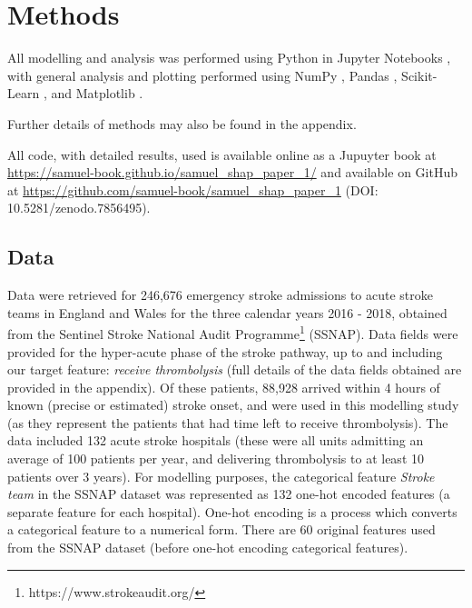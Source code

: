 \renewcommand{\thefootnote}{\alph{footnote}} %

\section{Methods}

All modelling and analysis was performed using Python in Jupyter Notebooks \cite{kluyver_jupyter_2016}, with general analysis and plotting performed using NumPy \cite{harris_array_2020}, Pandas \cite{mckinney-proc-scipy-2010}, Scikit-Learn  \cite{pedregosa_scikit-learn_2011}, and Matplotlib \cite{hunter_matplotlib_2007}. 

Further details of methods may also be found in the appendix. 

All code, with detailed results, used is available online as a Jupuyter book at \url{https://samuel-book.github.io/samuel_shap_paper_1/} and available on GitHub at \url{https://github.com/samuel-book/samuel_shap_paper_1} (DOI: 10.5281/zenodo.7856495). 


\subsection{Data}

Data were retrieved for 246,676 emergency stroke admissions to acute stroke teams in England and Wales for the three calendar years 2016 - 2018, obtained from the Sentinel Stroke National Audit Programme\footnote{https://www.strokeaudit.org/} (SSNAP). Data fields were provided for the hyper-acute phase of the stroke pathway, up to and including our target feature: \emph{receive thrombolysis} (full details of the data fields obtained are provided in the appendix). Of these patients, 88,928 arrived within 4 hours of known (precise or estimated) stroke onset, and were used in this modelling study (as they represent the patients that had time left to receive thrombolysis). The data included 132 acute stroke hospitals (these were all units admitting an average of 100 patients per year, and delivering thrombolysis to at least 10 patients over 3 years). For modelling purposes, the categorical feature \emph{Stroke team} in the SSNAP dataset was represented as 132 one-hot encoded features (a separate feature for each hospital). One-hot encoding is a process which converts a categorical feature to a numerical form. There are 60 original features used from the SSNAP dataset (before one-hot encoding categorical features).

